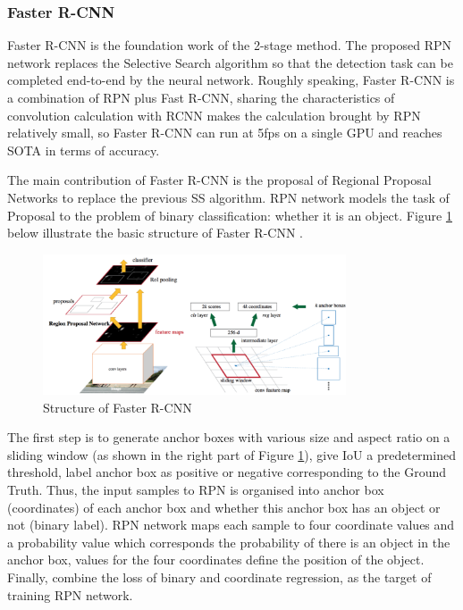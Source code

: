 \subsubsection{Faster R-CNN}
\label{sec:fasterrcnn}
Faster R-CNN \cite{fasterrcnn} is the foundation work of the 2-stage method. The proposed RPN network replaces the Selective Search algorithm so that the detection task can be completed end-to-end by the neural network. Roughly speaking, Faster R-CNN is a combination of RPN plus Fast R-CNN, sharing the characteristics of convolution calculation with RCNN makes the calculation brought by RPN relatively small, so Faster R-CNN can run at 5fps on a single GPU and reaches SOTA in terms of accuracy.

The main contribution of Faster R-CNN \cite{fasterrcnn} is the proposal of Regional Proposal Networks to replace the previous SS algorithm. RPN network models the task of Proposal to the problem of binary classification: whether it is an object. Figure \ref{fig:fasterrcnn} below illustrate the basic structure of Faster R-CNN \cite{fasterrcnn}.

\begin{figure}[h!]
\centering
\includegraphics[width=0.8\textwidth]{fasterrcnn.pdf}
\caption{Structure of Faster R-CNN \cite{fasterrcnn}}
\label{fig:fasterrcnn}
\end{figure}

The first step is to generate anchor boxes with various size and aspect ratio on a sliding window (as shown in the right part of Figure \ref{fig:fasterrcnn}), give IoU a predetermined threshold, label anchor box as positive or negative corresponding to the Ground Truth. Thus, the input samples to RPN is organised into anchor box (coordinates) of each anchor box and whether this anchor box has an object or not (binary label). RPN network maps each sample to four coordinate values and a probability value which corresponds the probability of there is an object in the anchor box, values for the four coordinates define the position of the object. Finally, combine the loss of binary and coordinate regression, as the target of training RPN network.

